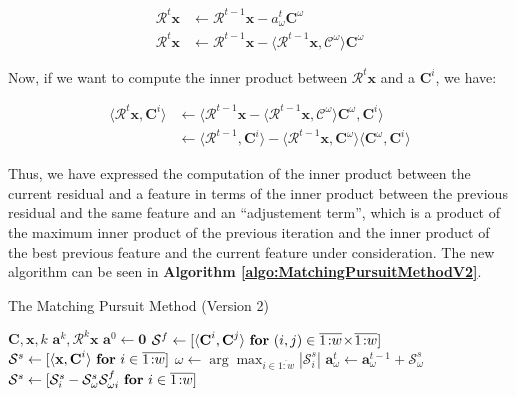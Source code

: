 \documentclass[12pt,a4paper,oneside,english]{UPBThesis}
\newcommand{\hctimes}[2]{{#1}\!\times\!{#2}}
\newcommand{\hcrange}[2]{\overline{{#1}\colon\!\!{#2}}}
\begin{document}
\begin{align*}
\mathcal{R}^t\textbf{x} & \gets \mathcal{R}^{t-1}\textbf{x} - a_\omega^t\textbf{C}^\omega \\
\mathcal{R}^t\textbf{x} & \gets \mathcal{R}^{t-1}\textbf{x} - \langle \mathcal{R}^{t-1}\textbf{x}, \mathcal{C}^\omega \rangle \textbf{C}^\omega
\end{align*}

Now, if we want to compute the inner product between $\mathcal{R}^t\textbf{x}$ and a $\textbf{C}^i$, we have:

\begin{align*}
\langle \mathcal{R}^t\textbf{x}, \textbf{C}^i \rangle & \gets \langle \mathcal{R}^{t-1}\textbf{x} - \langle \mathcal{R}^{t-1}\textbf{x}, \mathcal{C}^\omega \rangle \textbf{C}^\omega , \textbf{C}^i \rangle \\
& \gets \langle \mathcal{R}^{t-1}, \textbf{C}^i \rangle - \langle \mathcal{R}^{t-1}\textbf{x}, \textbf{C}^\omega \rangle \langle \textbf{C}^\omega, \textbf{C}^i \rangle
\end{align*}

Thus, we have expressed the computation of the inner product between the current residual and a feature in terms of the inner product between the previous residual and the same feature and an ``adjustement term'', which is a product of the maximum inner product of the previous iteration and the inner product of the best previous feature and the current feature under consideration. The new algorithm can be seen in \textbf{Algorithm \ref{algo:MatchingPursuitMethodV2}}.

\begin{algorithm}
\caption{The Matching Pursuit Method (Version 2)}
\label{algo:MatchingPursuitMethodV2}
\begin{algorithmic}
\Require $\textbf{C},\textbf{x},k$
\Ensure $\textbf{a}^k,\mathcal{R}^k\textbf{x}$
\State $\textbf{a}^0 \gets \textbf{0}$
\State $\mathcal{S}^f \gets [ \langle \textbf{C}^i, \textbf{C}^j \rangle ~ \mbox{\textbf{for} $(i,j) \in \hctimes{\hcrange{1}{w}}{\hcrange{1}{w}}$}]$
\State $\mathcal{S}^s \gets [ \langle \textbf{x}, \textbf{C}^i \rangle ~ \mbox{\textbf{for} $i \in \hcrange{1}{w}$} ]$
\For {$t = \hcrange{1}{k}$}
\State $\omega \gets \arg \max_{i \in \hcrange{1}{w}} \left| \mathcal{S}_i^s \right|$
\State $\textbf{a}_\omega^t \gets \textbf{a}_\omega^{t-1} + \mathcal{S}_\omega^s$
\State $\mathcal{S}^s \gets [ \mathcal{S}_i^s - \mathcal{S}_\omega^s \mathcal{S}_{\omega i}^f ~ \mbox{\textbf{for} $i \in \hcrange{1}{w}$} ]$
\EndFor
\end{algorithmic}
\end{algorithm}
\end{document}
